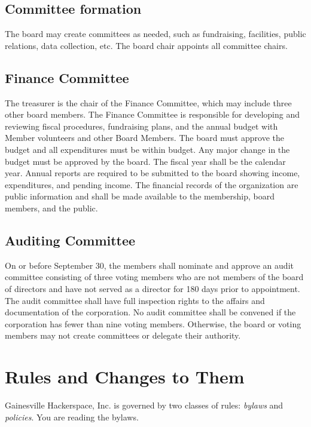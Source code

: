 \documentclass[10pt,letterpaper,titlepage]{article}
\newcommand\corpname{Gainesville Hackerspace, Inc.}
\begin{document}
\subsection{Committee formation}

The board may create committees as needed, such as fundraising, facilities,
public relations, data collection, etc.
The board chair appoints all committee chairs.

\subsection{Finance Committee}

The treasurer is the chair of the Finance Committee, which may include three
other board members.
The Finance Committee is responsible for developing and reviewing fiscal
procedures, fundraising plans, and the annual budget with Member volunteers and
other Board Members.
The board must approve the budget and all expenditures must be within budget.
Any major change in the budget must be approved by the board.
The fiscal year shall be the calendar year.
Annual reports are required to be submitted to the board showing income,
expenditures, and pending income.
The financial records of the organization are public information and shall be
made available to the membership, board members, and the public.

\subsection{Auditing Committee}

On or before September 30, the members shall nominate and approve an audit
committee consisting of three voting members who are not members of the board
of directors and have not served as a director for 180 days prior to
appointment.
The audit committee shall have full inspection rights to the affairs and
documentation of the corporation.
No audit committee shall be convened if the corporation has fewer than nine
voting members.
Otherwise, the board or voting members may not create committees or delegate
their authority.

\section{Rules and Changes to Them}
\label{rules}

\corpname{} is governed by two classes of rules: \emph{bylaws} and
\emph{policies}. You are reading the bylaws.
\end{document}
